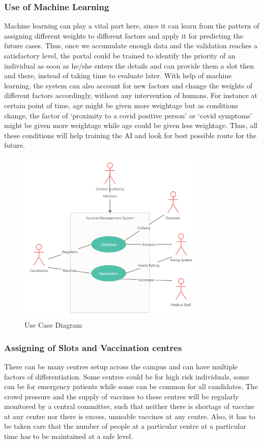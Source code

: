 \documentclass[10pt,twocolumn,letterpaper]{article}
\begin{document}
\subsubsection{Use of Machine Learning}
Machine learning can play a vital part here, since it can learn from the pattern of assigning different weights to different factors and apply it for predicting the future cases. Thus, once we accumulate enough data and the validation reaches a satisfactory level, the portal could be trained to identify the priority of an individual as soon as he/she enters the details and can provide them a slot then and there, instead of taking time to evaluate later. With help of machine learning, the system can also account for new factors and change the weights of different factors accordingly, without any intervention of humans. For instance at certain point of time, age might be given more weightage but as conditions change, the factor of ‘proximity to a covid positive person’ or ‘covid symptoms’ might be given more weightage while age could be given less weightage. Thus, all these conditions will help training the AI and look for best possible route for the future.
\begin{figure}[htp]
	\includegraphics[width=9cm]{./images/use_case_diagram.png}
	\caption{Use Case Diagram}
	\label{fig:galaxy}
\end{figure}
\subsubsection{Assigning of Slots and Vaccination centres}
There can be many centres setup across the campus and can have multiple factors of differentiation. Some centres could be for high risk individuals, some can be for emergency patients while some can be common for all candidates. The crowd pressure and the supply of vaccines to these centres will be regularly monitored by a central committee, such that neither there is shortage of vaccine at any centre nor there is excess, unusable vaccines at any centre. Also, it has to be taken care that the number of people at a particular centre at a particular time has to be maintained at a safe level.
\end{document}
